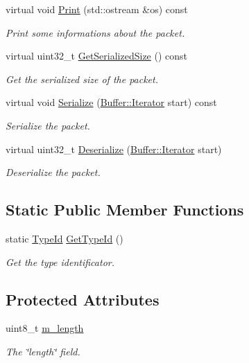 \begin{DoxyCompactItemize}
virtual void \hyperlink{classns3_1_1Ipv6ExtensionHeader_a69fa606b2e0e1b14bfc4190093248024}{Print} (std\+::ostream \&os) const 
\begin{DoxyCompactList}\small\item\em Print some informations about the packet. \end{DoxyCompactList}\item 
virtual uint32\+\_\+t \hyperlink{classns3_1_1Ipv6ExtensionHeader_a7c672fe6e6c117bc94b382379072bb91}{Get\+Serialized\+Size} () const 
\begin{DoxyCompactList}\small\item\em Get the serialized size of the packet. \end{DoxyCompactList}\item 
virtual void \hyperlink{classns3_1_1Ipv6ExtensionHeader_a98bce1a4ea1265b45c480eed63dc2893}{Serialize} (\hyperlink{classns3_1_1Buffer_1_1Iterator}{Buffer\+::\+Iterator} start) const 
\begin{DoxyCompactList}\small\item\em Serialize the packet. \end{DoxyCompactList}\item 
virtual uint32\+\_\+t \hyperlink{classns3_1_1Ipv6ExtensionHeader_a20381aa4706f87bd373604ea53f3488f}{Deserialize} (\hyperlink{classns3_1_1Buffer_1_1Iterator}{Buffer\+::\+Iterator} start)
\begin{DoxyCompactList}\small\item\em Deserialize the packet. \end{DoxyCompactList}\end{DoxyCompactItemize}
\subsection*{Static Public Member Functions}
\begin{DoxyCompactItemize}
\item 
static \hyperlink{classns3_1_1TypeId}{Type\+Id} \hyperlink{classns3_1_1Ipv6ExtensionHeader_a57740731923fd84128c1d63cbe3a1dba}{Get\+Type\+Id} ()
\begin{DoxyCompactList}\small\item\em Get the type identificator. \end{DoxyCompactList}\end{DoxyCompactItemize}
\subsection*{Protected Attributes}
\begin{DoxyCompactItemize}
\item 
uint8\+\_\+t \hyperlink{classns3_1_1Ipv6ExtensionHeader_aebd490c06dfde17f84b92baa3349afc8}{m\+\_\+length}
\begin{DoxyCompactList}\small\item\em The \char`\"{}length\char`\"{} field. \end{DoxyCompactList}\end{DoxyCompactItemize}
